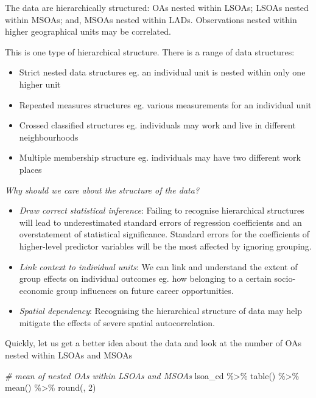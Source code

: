 \documentclass[
]{book}
\newenvironment{Shaded}{\begin{snugshade}}{\end{snugshade}}
\newcommand{\CommentTok}[1]{\textcolor[rgb]{0.56,0.35,0.01}{\textit{#1}}}
\newcommand{\DecValTok}[1]{\textcolor[rgb]{0.00,0.00,0.81}{#1}}
\newcommand{\FunctionTok}[1]{\textcolor[rgb]{0.00,0.00,0.00}{#1}}
\newcommand{\NormalTok}[1]{#1}
\newcommand{\SpecialCharTok}[1]{\textcolor[rgb]{0.00,0.00,0.00}{#1}}
\begin{document}
The data are hierarchically structured: OAs nested within LSOAs; LSOAs nested within MSOAs; and, MSOAs nested within LADs. Observations nested within higher geographical units may be correlated.

This is one type of hierarchical structure. There is a range of data structures:

\begin{itemize}
\item
  Strict nested data structures eg. an individual unit is nested within only one higher unit
\item
  Repeated measures structures eg. various measurements for an individual unit
\item
  Crossed classified structures eg. individuals may work and live in different neighbourhoods
\item
  Multiple membership structure eg. individuals may have two different work places
\end{itemize}

\emph{Why should we care about the structure of the data?}

\begin{itemize}
\item
  \emph{Draw correct statistical inference}: Failing to recognise hierarchical structures will lead to underestimated standard errors of regression coefficients and an overstatement of statistical significance. Standard errors for the coefficients of higher-level predictor variables will be the most affected by ignoring grouping.
\item
  \emph{Link context to individual units}: We can link and understand the extent of group effects on individual outcomes eg. how belonging to a certain socio-economic group influences on future career opportunities.
\item
  \emph{Spatial dependency}: Recognising the hierarchical structure of data may help mitigate the effects of severe spatial autocorrelation.
\end{itemize}

Quickly, let us get a better idea about the data and look at the number of OAs nested within LSOAs and MSOAs

\begin{Shaded}
\begin{Highlighting}[]
\CommentTok{\# mean of nested OAs within LSOAs and MSOAs}
\NormalTok{lsoa\_cd }\SpecialCharTok{\%\textgreater{}\%} \FunctionTok{table}\NormalTok{() }\SpecialCharTok{\%\textgreater{}\%}
  \FunctionTok{mean}\NormalTok{() }\SpecialCharTok{\%\textgreater{}\%}
  \FunctionTok{round}\NormalTok{(, }\DecValTok{2}\NormalTok{)}
\end{Highlighting}
\end{Shaded}
\end{document}
